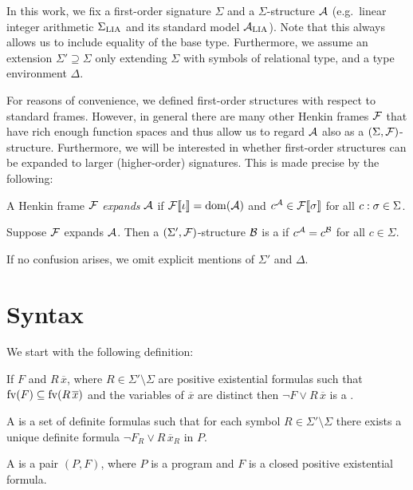 \documentclass[a4paper,twoside,notitlepage,openright,11pt]{report}
\begin{document}
In this work, we fix a first-order signature $\Sigma$ and a $\Sigma$-structure  $\mathcal A$ (e.g.\ linear integer arithmetic $\Sigma_{\operatorname{LIA}}$ and its standard model $\mathcal A_{\operatorname{LIA}}$). Note that this always allows us to include equality of the base type. Furthermore, we assume an extension $\Sigma'\supseteq\Sigma$ only extending $\Sigma$ with symbols of relational type, and a type environment $\Delta$.

For reasons of convenience, we defined first-order structures with respect to standard frames. However, in general there are many other Henkin frames $\mathcal F$ that have rich enough function spaces and thus allow us to regard $\mathcal A$ also as a $(\Sigma,\mathcal F)$-structure. Furthermore, we will be interested in whether first-order structures can be expanded to larger (higher-order) signatures. This is made precise by the following:
\begin{definition}
  \begin{thmlist}
  \item A Henkin frame $\mathcal F$ \emph{expands} $\mathcal A$ if ${\mathcal F}\llbracket\iota\rrbracket=\operatorname{dom}(\mathcal A)$ and $c^\mathcal A\in{\mathcal F}\llbracket\sigma\rrbracket$ for all $c:\sigma\in\Sigma$.
  \item Suppose  $\mathcal F$ expands $\mathcal A$. Then a $(\Sigma',\mathcal F)$-structure $\mathcal B$ is a  if $c^\mathcal A=c^\mathcal B$ for all $c\in\Sigma$.
  \end{thmlist}
\end{definition}

If no confusion arises, we omit explicit mentions of $\Sigma'$ and $\Delta$. %

\section{Syntax}
We start with the following definition:
\begin{definition}
  \begin{thmlist}
  \item If $F$ and $R\,\overline x$, where $R\in\Sigma'\setminus\Sigma$ are positive existential formulas such that $\operatorname{fv}(F)\subseteq\operatorname{fv}(R\,\overline x)$ and the variables of $\overline x$ are distinct then $\neg F\lor R\,\overline x$ is a .
  \item A  is a set of definite formulas such that for each symbol $R\in\Sigma'\setminus\Sigma$ there exists a unique definite formula $\neg F_R\lor R\,\overline x_R$ in $P$.
  \item A  is a pair $(P,F)$, where $P$ is a program and $F$ is a closed positive existential formula.
  \end{thmlist}
\end{definition}
\end{document}
